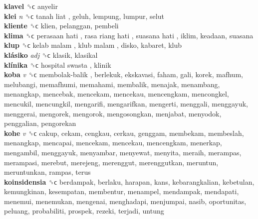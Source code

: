 \textbf{klavel} ␝ϲ  anyelir  \\
\textbf{klei} \emph{n}  ␝ϲ   tanah liat , geluh, lempung, lumpur, selut  \\
\textbf{kliente} ␝ϲ  klien, pelanggan, pembeli  \\
\textbf{klima} ␝ϲ   perasaan hati ,  rasa riang hati ,  suasana hati , iklim, keadaan, suasana  \\
\textbf{klup} ␝ϲ   kelab malam ,  klub malam , disko, kabaret, klub  \\
\textbf{klásiko} \emph{adj}  ␝ϲ  klasik, klasikal  \\
\textbf{klínika} ␝ϲ   hospital swasta , klinik  \\
\textbf{koba} \emph{v}  ␝ϲ   membolak-balik , berlekuk, ekskavasi, faham, gali, korek, mafhum, melubangi, memafhumi, memahami, membalik, menajak, menambang, menangkap, mencebak, mencekam, mencekau, mencengkam, mencongkel, mencukil, mencungkil, mengarifi, mengarifkan, mengerti, menggali, menggayuk, menggerai, mengorek, mengorok, mengosongkan, menjabat, menyodok, penggalian, pengorekan  \\
\textbf{kohe} \emph{v}  ␝ϲ  cakup, cekam, cengkau, cerkau, genggam, membekam, membeslah, menangkap, mencapai, mencekam, mencekau, mencengkam, menerkap, mengambil, menggayuk, menyambar, menyewat, menyita, meraih, merampas, merampasi, merebut, merejeng, merenggut, merenggutkan, meruntun, meruntunkan, rampas, terus  \\
\textbf{koinsidensia} ␝ϲ  berdampak, berlaku, harapan, kans, kebarangkalian, kebetulan, kemungkinan, kesempatan, membentur, menampel, mendampak, mendapati, menemui, menemukan, mengenai, menghadapi, menjumpai, nasib, oportunitas, peluang, probabiliti, prospek, rezeki, terjadi, untung  \\
